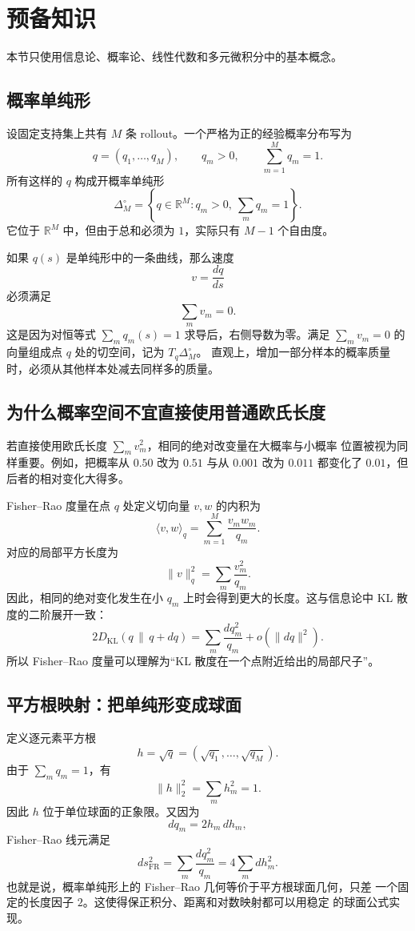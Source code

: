 \documentclass[UTF8,11pt]{ctexart}
\newcommand{\R}{\mathbb{R}}
\newcommand{\simplex}{\Delta_M^\circ}
\begin{document}
\section{预备知识}

本节只使用信息论、概率论、线性代数和多元微积分中的基本概念。

\subsection{概率单纯形}

设固定支持集上共有 \(M\) 条 rollout。一个严格为正的经验概率分布写为
\[
    q=(q_1,\ldots,q_M),\qquad
    q_m>0,\qquad \sum_{m=1}^{M}q_m=1.
\]
所有这样的 \(q\) 构成开概率单纯形
\[
    \simplex
    =
    \left\{
    q\in\R^M:
    q_m>0,\ \sum_m q_m=1
    \right\}.
\]
它位于 \(\R^M\) 中，但由于总和必须为 \(1\)，实际只有 \(M-1\) 个自由度。

如果 \(q(s)\) 是单纯形中的一条曲线，那么速度
\[
    v=\frac{dq}{ds}
\]
必须满足
\[
    \sum_m v_m=0.
\]
这是因为对恒等式 \(\sum_mq_m(s)=1\) 求导后，右侧导数为零。满足
\(\sum_m v_m=0\) 的向量组成点 \(q\) 处的切空间，记为 \(T_q\simplex\)。
直观上，增加一部分样本的概率质量时，必须从其他样本处减去同样多的质量。

\subsection{为什么概率空间不宜直接使用普通欧氏长度}

若直接使用欧氏长度 \(\sum_m v_m^2\)，相同的绝对改变量在大概率与小概率
位置被视为同样重要。例如，把概率从 \(0.50\) 改为 \(0.51\) 与从
\(0.001\) 改为 \(0.011\) 都变化了 \(0.01\)，但后者的相对变化大得多。

Fisher--Rao 度量在点 \(q\) 处定义切向量 \(v,w\) 的内积为
\[
    \langle v,w\rangle_q
    =
    \sum_{m=1}^{M}\frac{v_mw_m}{q_m}.
\]
对应的局部平方长度为
\[
    \|v\|_q^2
    =
    \sum_m\frac{v_m^2}{q_m}.
\]
因此，相同的绝对变化发生在小 \(q_m\) 上时会得到更大的长度。这与信息论中
KL 散度的二阶展开一致：
\[
    2D_{\mathrm{KL}}(q\,\|\,q+dq)
    =
    \sum_m\frac{dq_m^2}{q_m}
    +o(\|dq\|^2).
\]
所以 Fisher--Rao 度量可以理解为“KL 散度在一个点附近给出的局部尺子”。

\subsection{平方根映射：把单纯形变成球面}

定义逐元素平方根
\[
    h=\sqrt q
    =
    (\sqrt{q_1},\ldots,\sqrt{q_M}).
\]
由于 \(\sum_mq_m=1\)，有
\[
    \|h\|_2^2=\sum_mh_m^2=1.
\]
因此 \(h\) 位于单位球面的正象限。又因为
\[
    dq_m=2h_m\,dh_m,
\]
Fisher--Rao 线元满足
\[
    ds_{\mathrm{FR}}^2
    =
    \sum_m\frac{dq_m^2}{q_m}
    =
    4\sum_mdh_m^2.
\]
也就是说，概率单纯形上的 Fisher--Rao 几何等价于平方根球面几何，只差
一个固定的长度因子 \(2\)。这使得保正积分、距离和对数映射都可以用稳定
的球面公式实现。
\end{document}
